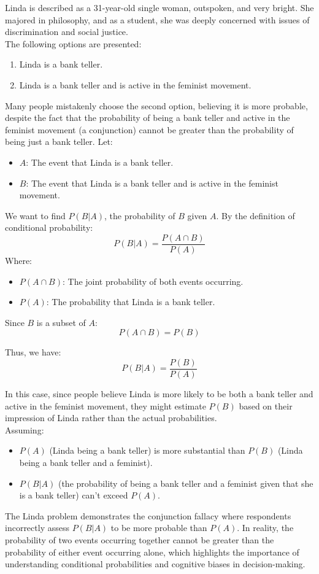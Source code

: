 Linda is described as a 31-year-old single woman, outspoken, and very bright. She majored in philosophy, and as a student, she was deeply concerned with issues of discrimination and social justice.\\

The following options are presented:
\begin{enumerate}
    \item Linda is a bank teller.
    \item Linda is a bank teller and is active in the feminist movement.
\end{enumerate}

Many people mistakenly choose the second option, believing it is more probable, despite the fact that the probability of being a bank teller and active in the feminist movement (a conjunction) cannot be greater than the probability of being just a bank teller. Let:
\begin{itemize}
    \item \( A \): The event that Linda is a bank teller.
    \item \( B \): The event that Linda is a bank teller and is active in the feminist movement.
\end{itemize}

We want to find \( P(B | A) \), the probability of \( B \) given \( A \). By the definition of conditional probability:
\[
P(B | A) = \frac{P(A \cap B)}{P(A)}
\]
Where:
\begin{itemize}
    \item \( P(A \cap B) \): The joint probability of both events occurring.
    \item \( P(A) \): The probability that Linda is a bank teller.
\end{itemize}

Since \( B \) is a subset of \( A \):
\[
P(A \cap B) = P(B)
\]

Thus, we have:
\[
P(B | A) = \frac{P(B)}{P(A)}
\]

In this case, since people believe Linda is more likely to be both a bank teller and active in the feminist movement, they might estimate \( P(B) \) based on their impression of Linda rather than the actual probabilities. \\

Assuming:
\begin{itemize}
    \item \( P(A) \) (Linda being a bank teller) is more substantial than \( P(B) \) (Linda being a bank teller and a feminist).
    \item \( P(B | A) \) (the probability of being a bank teller and a feminist given that she is a bank teller) can’t exceed \( P(A) \).
\end{itemize}

The Linda problem demonstrates the conjunction fallacy where respondents incorrectly assess \( P(B | A) \) to be more probable than \( P(A) \). In reality, the probability of two events occurring together cannot be greater than the probability of either event occurring alone, which highlights the importance of understanding conditional probabilities and cognitive biases in decision-making.
